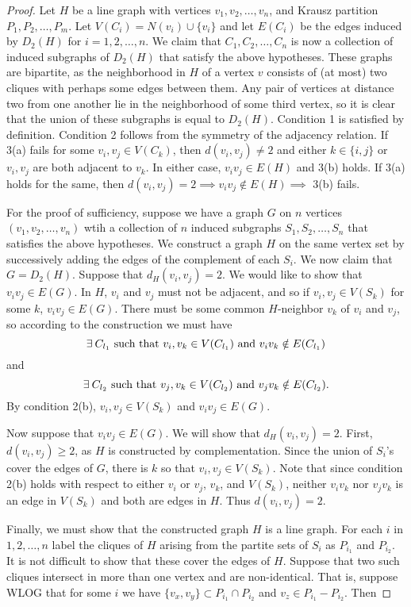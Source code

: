 \begin{proof}
Let $H$ be a line graph with vertices $v_1, v_2, \ldots, v_n$, and Krausz partition $P_1, P_2, \ldots, P_m$.  Let $V(C_i) = N(v_i) \cup \{v_i\}$ and let $E(C_i)$ be the edges induced by $D_2(H)$ for $i = 1,2,\ldots, n$.  We claim that $C_1, C_2, \ldots, C_n$ is now a collection of induced subgraphs of $D_2(H)$ that satisfy the above hypotheses.  These graphs are bipartite, as the neighborhood in $H$ of a vertex $v$ consists of (at most) two cliques with perhaps some edges between them.  Any pair of vertices at distance two from one another lie in the neighborhood of some third vertex, so it is clear that the union of these subgraphs is equal to $D_2(H)$.  Condition 1 is satisfied by definition.  Condition 2 follows from the symmetry of the adjacency relation.  If 3(a) fails for some $v_i, v_j \in V(C_k)$, then $d(v_i, v_j) \neq 2$ and either $k \in \{i,j\}$ or $v_i, v_j$ are both adjacent to $v_k$.  In either case, $v_iv_j \in E(H)$ and 3(b) holds.  If 3(a) holds for the same, then $d(v_i, v_j) = 2 \implies v_iv_j \notin E(H) \implies$ 3(b) fails.

For the proof of sufficiency, suppose we have a graph $G$ on $n$ vertices $(v_1, v_2, \ldots, v_n)$ wtih a collection of $n$ induced subgraphs $S_1, S_2, \ldots, S_n$ that satisfies the above hypotheses.  We construct a graph $H$ on the same vertex set by successively adding the edges of the complement of each $S_i$.  We now claim that $G = D_2(H)$.  Suppose that $d_H(v_i, v_j) = 2$.  We would like to show that $v_iv_j\in E(G)$.  In $H$, $v_i$ and $v_j$ must not be adjacent, and so if $v_i, v_j \in V(S_k)$ for some $k$, $v_iv_j \in E(G)$.  There must be some common $H$-neighbor $v_k$ of $v_i$ and $v_j$, so according to the construction we must have
\[\exists\: C_{l_1} \makebox{ such that } v_i, v_k \in V(C_{l_1}) \makebox{ and } v_iv_k\notin E(C_{l_1})\] and
\[\exists\: C_{l_2} \makebox{ such that } v_j, v_k \in V(C_{l_2}) \makebox{ and } v_jv_k\notin E(C_{l_2}).\]  By condition 2(b), $v_i, v_j \in V(S_k)$ and $v_iv_j \in E(G)$.

Now suppose that $v_iv_j \in E(G)$.  We will show that $d_H(v_i, v_j) = 2$.  First, $d(v_i,v_j) \geq 2$, as $H$ is constructed by complementation.  Since the union of $S_i$'s cover the edges of $G$, there is $k$ so that $v_i, v_j \in V(S_k)$.  Note that since condition 2(b) holds with respect to either $v_i$ or $v_j$, $v_k$, and $V(S_k)$, neither $v_iv_k$ nor $v_jv_k$ is an edge in $V(S_k)$ and both are edges in $H$.  Thus $d(v_i, v_j) = 2$.

Finally, we must show that the constructed graph $H$ is a line graph.  For each $i$ in $1,2,\ldots,n$ label the cliques of $H$ arising from the partite sets of $S_i$ as $P_{i_1}$ and $P_{i_2}$.  It is not difficult to show that these cover the edges of $H$.  Suppose that two such cliques intersect in more than one vertex and are non-identical.  That is, suppose WLOG that for some $i$ we have $\{v_x,v_y\} \subset P_{i_1} \cap P_{i_2}$ and $v_z \in P_{i_1} - P_{i_2}$.  Then 
\end{proof}

	

